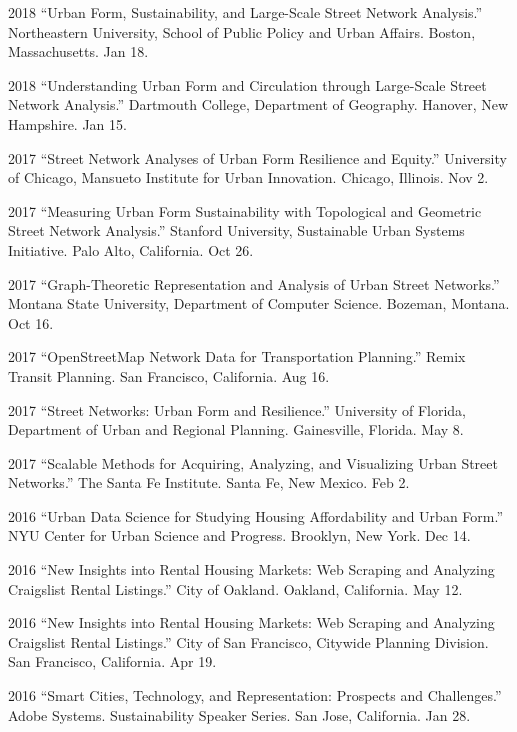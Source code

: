\documentclass[11pt,letterpaper]{report} %
\begin{document}
\begin{tablist}
        \item[2018] \tab{}\enquote{Urban Form, Sustainability, and Large-Scale Street Network Analysis.} Northeastern University, School of Public Policy and Urban Affairs. Boston, Massachusetts. Jan 18.

        \item[2018] \tab{}\enquote{Understanding Urban Form and Circulation through Large-Scale Street Network Analysis.} Dartmouth College, Department of Geography. Hanover, New Hampshire. Jan 15.

        \item[2017] \tab{}\enquote{Street Network Analyses of Urban Form Resilience and Equity.} University of Chicago, Mansueto Institute for Urban Innovation. Chicago, Illinois. Nov 2.

        \item[2017] \tab{}\enquote{Measuring Urban Form Sustainability with Topological and Geometric Street Network Analysis.} Stanford University, Sustainable Urban Systems Initiative. Palo Alto, California. Oct 26.

        \item[2017] \tab{}\enquote{Graph-Theoretic Representation and Analysis of Urban Street Networks.} Montana State University, Department of Computer Science. Bozeman, Montana. Oct 16.

        \item[2017] \tab{}\enquote{OpenStreetMap Network Data for Transportation Planning.} Remix Transit Planning. San Francisco, California. Aug 16.

        \item[2017] \tab{}\enquote{Street Networks: Urban Form and Resilience.} University of Florida, Department of Urban and Regional Planning. Gainesville, Florida. May 8.

        \item[2017] \tab{}\enquote{Scalable Methods for Acquiring, Analyzing, and Visualizing Urban Street Networks.} The Santa Fe Institute. Santa Fe, New Mexico. Feb 2.

        \item[2016] \tab{}\enquote{Urban Data Science for Studying Housing Affordability and Urban Form.} NYU Center for Urban Science and Progress. Brooklyn, New York. Dec 14.

        \item[2016] \tab{}\enquote{New Insights into Rental Housing Markets: Web Scraping and Analyzing Craigslist Rental Listings.} City of Oakland. Oakland, California. May 12.

        \item[2016] \tab{}\enquote{New Insights into Rental Housing Markets: Web Scraping and Analyzing Craigslist Rental Listings.} City of San Francisco, Citywide Planning Division. San Francisco, California. Apr 19.

        \item[2016] \tab{}\enquote{Smart Cities, Technology, and Representation: Prospects and Challenges.} Adobe Systems. Sustainability Speaker Series. San Jose, California. Jan 28.

    \end{tablist}
\end{document}
